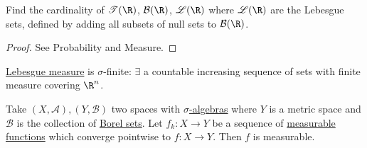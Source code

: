 \documentclass{article}
\begin{document}
\begin{ex}
    Find the cardinality of $\mathscr{T}(\R)$, $\mathcal{B}(\R)$, $\mathscr{L}(\R)$ where $\mathscr{L}(\R)$ are the Lebesgue sets, defined by adding all subsets of null sets to $\mathcal{B}(\R)$.
\end{ex}

\begin{proof}
    See Probability and Measure.
\end{proof}

\begin{remark}
    \hyperlink{def:lebMeas}{Lebesgue measure} is \hypertarget{def:sigFinite}{$\sigma$-finite}: $\exists$ a countable increasing sequence of sets with finite measure covering $\R^n$.
\end{remark}


\begin{prop}
    Take $(X, \mathscr{A}), (Y, \mathscr{B})$ two spaces with \hyperlink{def:sigAlg}{$\sigma$-algebras} where $Y$ is a metric space and $\mathscr{B}$ is the collection of \hyperlink{def:borelSet}{Borel sets}.
    Let $f_k: X \to Y$ be a sequence of \hyperlink{def:measFunc}{measurable functions} which converge pointwise to $f:X \to Y$.
    Then $f$ is measurable.
\end{prop}
\end{document}
